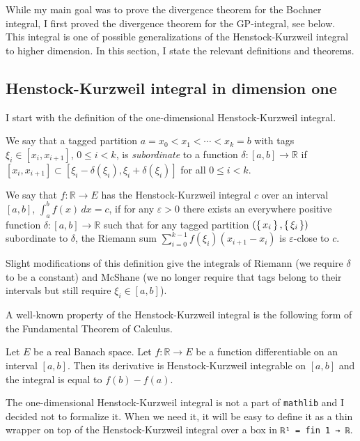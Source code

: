\documentclass[a4paper, UKenglish,cleveref, autoref, thm-restate]{lipics-v2021}
\newcommand{\bbR}{\mathbb{R}}
\newcommand{\eps}{\varepsilon}
\begin{document}
While my main goal was to prove the divergence theorem for the Bochner
integral, I first proved the divergence theorem for the GP-integral,
see below. This integral is one of possible generalizations of the
Henstock-Kurzweil integral to higher dimension. In this section, I
state the relevant definitions and theorems.

\subsection{Henstock-Kurzweil integral in dimension one}\label{sec:HK-integral-dim1}
I start with the definition of the one-dimensional Henstock-Kurzweil
integral.

\begin{definition}
  We say that a tagged partition \(a=x_{0}<x_{1}<\cdots<x_{k}=b\) with
  tags \(\xi_{i}\in[x_{i}, x_{i+1}]\), \(0\le i<k\), is
  \emph{subordinate} to a function \(\delta\colon[a, b]\to \bbR\) if
  \([x_{i}, x_{i+1}]\subset [\xi_{i}-\delta(\xi_{i}),
  \xi_{i}+\delta(\xi_{i})]\) for all \(0\le i<k\).

  We say that \(f\colon \bbR\to E\) has the Henstock-Kurzweil integral
  \(c\) over an interval \([a, b]\), \(\int_{a}^{b}f(x)\,dx=c\), if
  for any \(\eps>0\) there exists an everywhere positive function
  \(\delta\colon [a, b]\to \bbR\) such that for any tagged partition
  \((\set{x_{i}}, \set{\xi_{i}})\) subordinate to \(\delta\), the
  Riemann sum
  \(\displaystyle\sum_{i=0}^{k-1}f(\xi_{i})(x_{i+1}-x_{i}) \) is
  \(\eps\)-close to \(c\).
\end{definition}

Slight modifications of this definition give the integrals of Riemann
(we require \(\delta\) to be a constant) and McShane (we no longer
require that tags belong to their intervals but still require
\(\xi_{i}\in[a, b]\)).

A well-known property of the Henstock-Kurzweil integral is the
following form of the Fundamental Theorem of Calculus.
\begin{theorem}
  Let \(E\) be a real Banach space. Let \(f\colon \bbR\to E\) be a
  function differentiable on an interval \([a, b]\). Then its
  derivative is Henstock-Kurzweil integrable on \([a, b]\) and the
  integral is equal to \(f(b)-f(a)\).
\end{theorem}

The one-dimensional Henstock-Kurzweil integral is not a part of
\texttt{mathlib} and I decided not to formalize it. When we need it,
it will be easy to define it as a thin wrapper on top of the
Henstock-Kurzweil integral over a box in \lstinline+ℝ¹ = fin 1 → ℝ+.
\end{document}
